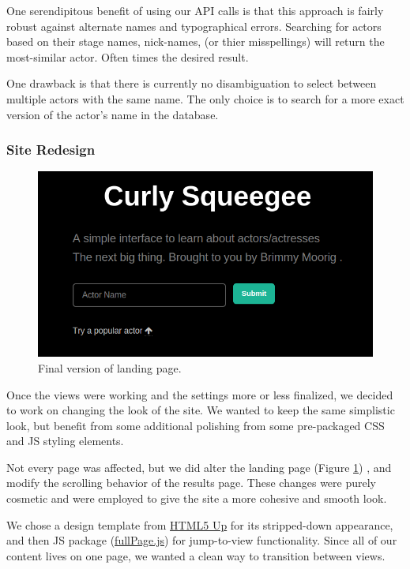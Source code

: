 \documentclass[12pt]{article}
\begin{document}
One serendipitous benefit of using our API calls is that this approach is fairly robust against alternate names and typographical errors.  Searching for actors based on their stage names, nick-names, (or thier misspellings) will return the most-similar actor. Often times the desired result.  

One drawback is that there is currently no disambiguation to select between multiple actors with the same name.  The only choice is to search for a more exact version of the actor's name in the database.

\subsubsection{Site Redesign}


\begin{figure}
\centering
\includegraphics[scale=0.3]{images/landingBoxFinal.png}
\caption{Final version of landing page.}\label{blackLandingPage}
\end{figure}


Once the views were working and the settings more or less finalized, we decided to work on changing the look of the site.  We wanted to keep the same simplistic look, but benefit from some additional polishing from some pre-packaged CSS and JS styling elements. 

Not every page was affected, but we did alter the landing page (Figure \ref{blackLandingPage}) , and modify the scrolling behavior of the results page.  These changes were purely cosmetic and were employed to give the site a more cohesive and smooth look.




We chose a design template from \href{http://html5up.net/}{HTML5 Up} for its stripped-down appearance, and then JS package (\href{http://alvarotrigo.com/fullPage/}{fullPage.js}) for jump-to-view functionality.  Since all of our content lives on one page, we wanted a clean way to transition between views.
\end{document}
